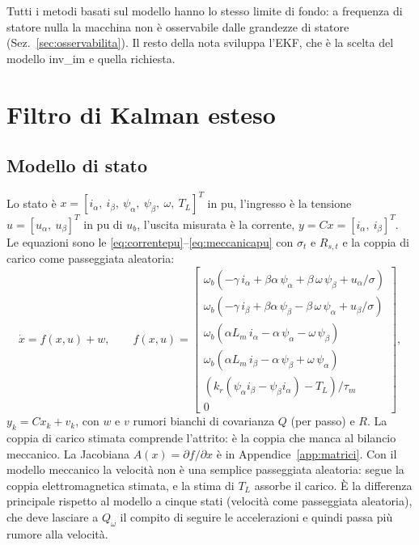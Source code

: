 \documentclass[10pt,a4paper]{scrartcl}
\newcommand{\wb}{\omega_b}
\newcommand{\kr}{k_r}
\newcommand{\taum}{\tau_m}
\begin{document}
\begin{onehalfspace}
Tutti i metodi basati sul modello hanno lo stesso limite di fondo: a frequenza di statore nulla la macchina non è osservabile dalle grandezze di statore (Sez.~\ref{sec:osservabilita}). Il resto della nota sviluppa l'EKF, che è la scelta del modello inv\_im e quella richiesta.

\section{Filtro di Kalman esteso}
\label{sec:ekf}

\subsection{Modello di stato}
\label{sec:stato}

Lo stato è $x = [i_\alpha,\ i_\beta,\ \psi_\alpha,\ \psi_\beta,\ \omega,\ T_L]^T$ in pu, l'ingresso è la tensione $u = [u_\alpha,\ u_\beta]^T$ in pu di $u_b$, l'uscita misurata è la corrente, $y = C x = [i_\alpha,\ i_\beta]^T$. Le equazioni sono le \eqref{eq:correntepu}--\eqref{eq:meccanicapu} con $\sigma_t$ e $R_{s,t}$ e la coppia di carico come passeggiata aleatoria:
\begin{equation}
\dot x = f(x,u) + w, \qquad f(x,u) =
\begin{bmatrix}
\wb\left(-\gamma\,i_\alpha + \beta\alpha\,\psi_\alpha + \beta\,\omega\,\psi_\beta + u_\alpha/\sigma\right)\\
\wb\left(-\gamma\,i_\beta + \beta\alpha\,\psi_\beta - \beta\,\omega\,\psi_\alpha + u_\beta/\sigma\right)\\
\wb\left(\alpha L_m\,i_\alpha - \alpha\,\psi_\alpha - \omega\,\psi_\beta\right)\\
\wb\left(\alpha L_m\,i_\beta - \alpha\,\psi_\beta + \omega\,\psi_\alpha\right)\\
\left(\kr(\psi_\alpha i_\beta - \psi_\beta i_\alpha) - T_L\right)/\taum\\
0
\end{bmatrix},
\label{eq:f}
\end{equation}
$y_k = C x_k + v_k$, con $w$ e $v$ rumori bianchi di covarianza $Q$ (per passo) e $R$. La coppia di carico stimata comprende l'attrito: è la coppia che manca al bilancio meccanico. La Jacobiana $A(x) = \partial f/\partial x$ è in Appendice~\ref{app:matrici}. Con il modello meccanico la velocità non è una semplice passeggiata aleatoria: segue la coppia elettromagnetica stimata, e la stima di $T_L$ assorbe il carico. È la differenza principale rispetto al modello a cinque stati (velocità come passeggiata aleatoria), che deve lasciare a $Q_\omega$ il compito di seguire le accelerazioni e quindi passa più rumore alla velocità.


\end{onehalfspace}
\end{document}
